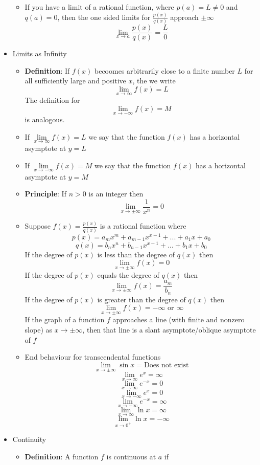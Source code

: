 \documentclass{article}
\begin{document}
\begin{itemize}
\begin{itemize}
		\item If you have a limit of a rational function, where $p(a) = L \neq 0$ and $q(a) = 0$, then the one sided limits for $\frac{p(x)}{q(x)}$ approach $\pm \infty$
		$$\lim_{x \to a}{\frac{p(x)}{q(x)}} = \frac{L}{0}$$
	\end{itemize}
	\item Limits as Infinity
	\begin{itemize}
		\item \textbf{Definition}: If $f(x)$ becoomes arbitrarily close to a finite number $L$ for all sufficiently large and positive $x$, the we write
		$$\lim_{x \to \infty}{f(x)} = L$$
		The definition for
		$$\lim_{x \to - \infty}{f(x)} = M$$
		is analogous.
		\item If $\lim\limits_{x \to \infty}{f(x)} = L$ we say that the function $f(x)$ has a horizontal asymptote at $y = L$
		\item If $\lim\limits_{x \to - \infty}{f(x)} = M$ we say that the function $f(x)$ has a horizontal asymptote at $y = M$
		\item \textbf{Principle}: If $n > 0$ is an integer then
		$$\lim_{x \to \pm \infty}{\frac{1}{x^n}} = 0$$
		\item Suppose $f(x) = \frac{p(x)}{q(x)}$ is a rational function where
		$$p(x) = a_mx^m + a_{m-1}x^{x-1} + ... + a_1x + a_0$$
		$$q(x) = b_nx^n + b_{n-1}x^{x-1} + ... + b_1x + b_0$$
		If the degree of $p(x)$ is less than the degree of $q(x)$ then
		$$\lim_{x \to \pm \infty}{f(x)} = 0$$
		If the degree of $p(x)$ equals the degree of $q(x)$ then
		$$\lim_{x \to \pm \infty}{f(x)} = \frac{a_m}{b_n}$$
		If the degree of $p(x)$ is greater than the degree of $q(x)$ then
		$$\lim_{x \to \pm \infty}{f(x)} = - \infty \text{ or } \infty$$
        If the graph of a function $f$ approaches a line (with finite and nonzero slope) as $x \to \pm \infty$, then that line is a slant asymptote/oblique asymptote of $f$
		\item End behaviour for transcendental functions
		$$\lim_{x \to \pm \infty}{\sin{x}} = \text{Does not exist}$$
		$$\lim_{x \to \infty}{e^x} = \infty$$
		$$\lim_{x \to \infty}{e^{-x}} = 0$$
		$$\lim_{x \to - \infty}{e^x} = 0$$
		$$\lim_{x \to - \infty}{e^{-x}} = \infty$$
		$$\lim_{x \to \infty}{\ln{x}} = \infty$$
		$$\lim_{x \to 0^+}{\ln{x}} = - \infty$$
	\end{itemize}
	\item Continuity \\
	\begin{itemize}
		\item \textbf{Definition}: A function $f$ is continuous at $a$ if

\end{itemize}
\end{itemize}
\end{document}
